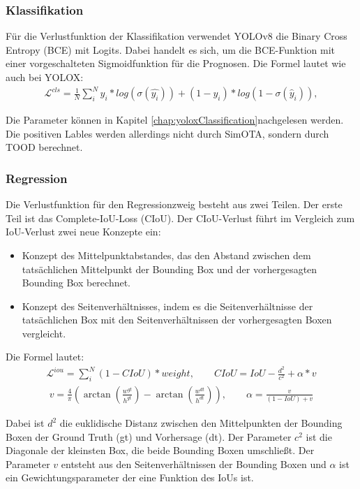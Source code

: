 \subsubsection{Klassifikation} 
Für die Verlustfunktion der Klassifikation verwendet YOLOv8 die Binary Cross Entropy (BCE) mit Logits. Dabei handelt es sich, um die BCE-Funktion mit einer vorgeschalteten Sigmoidfunktion für die Prognosen.
Die Formel lautet wie auch bei YOLOX:
\begin{align}
	\mathcal{L}^{cls}=\frac{1}{N}\sum_{i}^{N}y_i*log(\sigma(\hat{y_i}))+(1-y_i)*log(1-\sigma(\hat{y}_i)),
\end{align}

Die Parameter können in Kapitel \ref{chap:yoloxClassification}nachgelesen werden. Die positiven Lables werden allerdings nicht durch SimOTA, sondern durch TOOD berechnet.

\subsubsection{Regression} 
Die Verlustfunktion für den Regressionzweig besteht aus zwei Teilen. Der erste Teil ist das Complete-IoU-Loss (CIoU). Der CIoU-Verlust führt im Vergleich zum IoU-Verlust zwei neue Konzepte ein:
\begin{itemize}
\item Konzept des Mittelpunktabstandes, das den Abstand zwischen dem tatsächlichen Mittelpunkt der Bounding Box und der vorhergesagten Bounding Box berechnet.
\item Konzept des Seitenverhältnisses, indem es die Seitenverhältnisse der tatsächlichen Box mit den Seitenverhältnissen der vorhergesagten Boxen vergleicht.
\end{itemize}

Die Formel lautet:
\begin{align}
	\mathcal{L}^{iou}=\sum_{i}^{N}(1-CIoU)*weight, \qquad 	CIoU = IoU - \frac{d^2}{c^2}+\alpha*v
\end{align}
\begin{align}
	v=\frac{4}{\pi}(\arctan(\frac{w^{gt}}{h^{gt}})-\arctan(\frac{w^{dt}}{h^{dt}})), \qquad \alpha=\frac{v}{(1-IoU)+v}
\end{align}

Dabei ist $d^2$ die euklidische Distanz zwischen den Mittelpunkten der Bounding Boxen der Ground Truth (gt) und Vorhersage (dt). Der Parameter $c^2$ ist die Diagonale der kleinsten Box, die beide Bounding Boxen umschließt. Der Parameter $v$ entsteht aus den Seitenverhältnissen der Bounding Boxen und $\alpha$ ist ein Gewichtungsparameter der eine Funktion des IoUs ist. \cite{ciouLoss}

